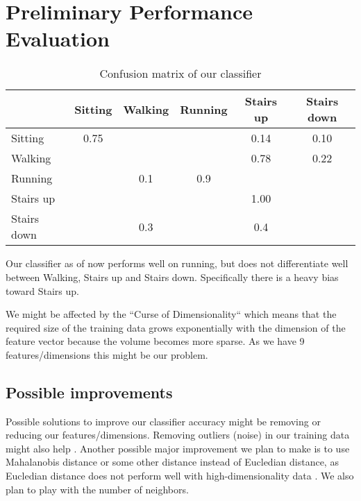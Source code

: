 \section{Preliminary Performance Evaluation}
\label{sec:perf-eval}

\begin{table}[ht]
\centering
\caption{Confusion matrix of our classifier}
\begin{tabular}{lccccc}
\toprule
 & Sitting & Walking & Running & Stairs up & Stairs down\\
\midrule
Sitting & 0.75 &  &  &  0.14 & 0.10\\
Walking &  &  &  & 0.78 & 0.22\\
Running &  & 0.1 & 0.9 &  & \\
Stairs up &  &  &  & 1.00 & \\
Stairs down &  & 0.3 &  & 0.4 & \\
\bottomrule
\end{tabular}
\label{tab:confusion-matrix}
\end{table}


Our classifier as of now performs well on running, but does not differentiate well between Walking, Stairs up and Stairs down. Specifically there is a heavy bias toward Stairs up.

We might be affected by the ``Curse of Dimensionality`` \cite{wikipedia2} which means that the required size of the training data grows exponentially with the dimension of the feature vector because the volume becomes more sparse. As we have 9 features/dimensions this might be our problem.

\subsection{Possible improvements}

Possible solutions to improve our classifier accuracy might be removing or reducing our features/dimensions.
Removing outliers (noise) in our training data might also help \cite{wikipedia1}.
Another possible major improvement we plan to make is to use Mahalanobis distance or some other distance instead of Eucledian distance, as Eucledian distance does not perform well with high-dimensionality data \cite{wikipedia1}.
We also plan to play with the number of neighbors.
